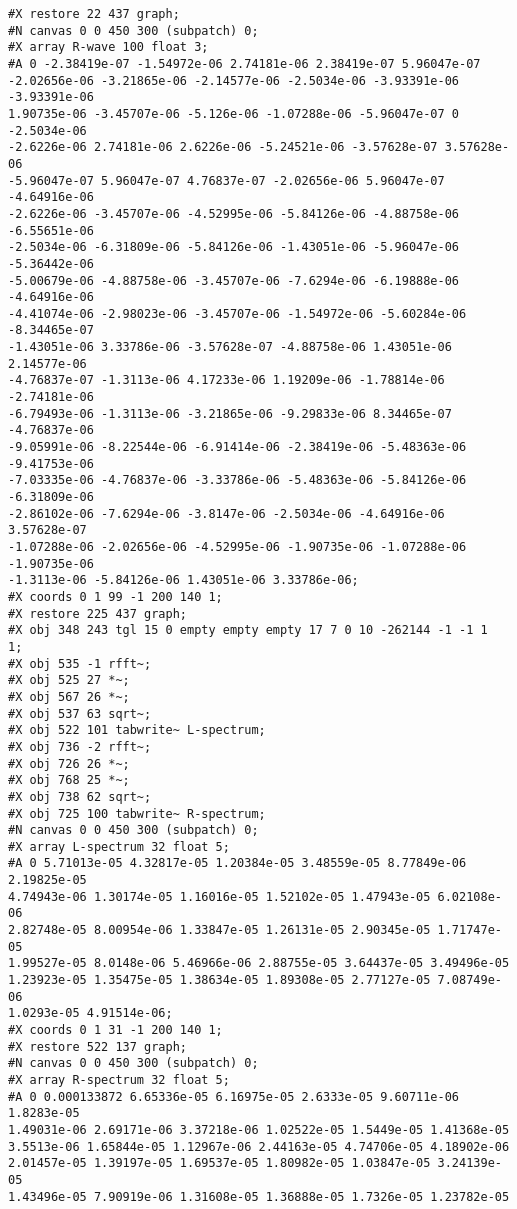 \begin{itemize}
\begin{verbatim}
#X restore 22 437 graph;
#N canvas 0 0 450 300 (subpatch) 0;
#X array R-wave 100 float 3;
#A 0 -2.38419e-07 -1.54972e-06 2.74181e-06 2.38419e-07 5.96047e-07
-2.02656e-06 -3.21865e-06 -2.14577e-06 -2.5034e-06 -3.93391e-06 -3.93391e-06
1.90735e-06 -3.45707e-06 -5.126e-06 -1.07288e-06 -5.96047e-07 0 -2.5034e-06
-2.6226e-06 2.74181e-06 2.6226e-06 -5.24521e-06 -3.57628e-07 3.57628e-06
-5.96047e-07 5.96047e-07 4.76837e-07 -2.02656e-06 5.96047e-07 -4.64916e-06
-2.6226e-06 -3.45707e-06 -4.52995e-06 -5.84126e-06 -4.88758e-06 -6.55651e-06
-2.5034e-06 -6.31809e-06 -5.84126e-06 -1.43051e-06 -5.96047e-06 -5.36442e-06
-5.00679e-06 -4.88758e-06 -3.45707e-06 -7.6294e-06 -6.19888e-06 -4.64916e-06
-4.41074e-06 -2.98023e-06 -3.45707e-06 -1.54972e-06 -5.60284e-06 -8.34465e-07
-1.43051e-06 3.33786e-06 -3.57628e-07 -4.88758e-06 1.43051e-06 2.14577e-06
-4.76837e-07 -1.3113e-06 4.17233e-06 1.19209e-06 -1.78814e-06 -2.74181e-06
-6.79493e-06 -1.3113e-06 -3.21865e-06 -9.29833e-06 8.34465e-07 -4.76837e-06
-9.05991e-06 -8.22544e-06 -6.91414e-06 -2.38419e-06 -5.48363e-06 -9.41753e-06
-7.03335e-06 -4.76837e-06 -3.33786e-06 -5.48363e-06 -5.84126e-06 -6.31809e-06
-2.86102e-06 -7.6294e-06 -3.8147e-06 -2.5034e-06 -4.64916e-06 3.57628e-07
-1.07288e-06 -2.02656e-06 -4.52995e-06 -1.90735e-06 -1.07288e-06 -1.90735e-06
-1.3113e-06 -5.84126e-06 1.43051e-06 3.33786e-06;
#X coords 0 1 99 -1 200 140 1;
#X restore 225 437 graph;
#X obj 348 243 tgl 15 0 empty empty empty 17 7 0 10 -262144 -1 -1 1
1;
#X obj 535 -1 rfft~;
#X obj 525 27 *~;
#X obj 567 26 *~;
#X obj 537 63 sqrt~;
#X obj 522 101 tabwrite~ L-spectrum;
#X obj 736 -2 rfft~;
#X obj 726 26 *~;
#X obj 768 25 *~;
#X obj 738 62 sqrt~;
#X obj 725 100 tabwrite~ R-spectrum;
#N canvas 0 0 450 300 (subpatch) 0;
#X array L-spectrum 32 float 5;
#A 0 5.71013e-05 4.32817e-05 1.20384e-05 3.48559e-05 8.77849e-06 2.19825e-05
4.74943e-06 1.30174e-05 1.16016e-05 1.52102e-05 1.47943e-05 6.02108e-06
2.82748e-05 8.00954e-06 1.33847e-05 1.26131e-05 2.90345e-05 1.71747e-05
1.99527e-05 8.0148e-06 5.46966e-06 2.88755e-05 3.64437e-05 3.49496e-05
1.23923e-05 1.35475e-05 1.38634e-05 1.89308e-05 2.77127e-05 7.08749e-06
1.0293e-05 4.91514e-06;
#X coords 0 1 31 -1 200 140 1;
#X restore 522 137 graph;
#N canvas 0 0 450 300 (subpatch) 0;
#X array R-spectrum 32 float 5;
#A 0 0.000133872 6.65336e-05 6.16975e-05 2.6333e-05 9.60711e-06 1.8283e-05
1.49031e-06 2.69171e-06 3.37218e-06 1.02522e-05 1.5449e-05 1.41368e-05
3.5513e-06 1.65844e-05 1.12967e-06 2.44163e-05 4.74706e-05 4.18902e-06
2.01457e-05 1.39197e-05 1.69537e-05 1.80982e-05 1.03847e-05 3.24139e-05
1.43496e-05 7.90919e-06 1.31608e-05 1.36888e-05 1.7326e-05 1.23782e-05

\end{verbatim}
\end{itemize}
